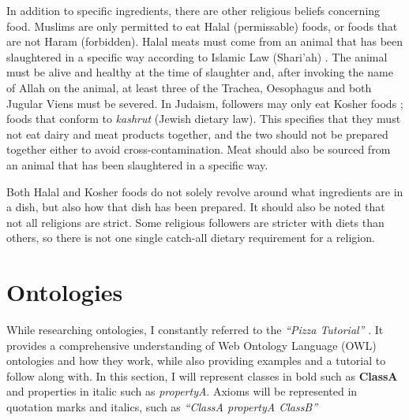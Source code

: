 In addition to specific ingredients, there are other religious beliefs concerning food. Muslims are only permitted to eat Halal (permissable) foods, or foods that are not Haram (forbidden). Halal meats must come from an animal that has been slaughtered in a specific way according to Islamic Law (Shari'ah) \cite{halal_monitoring_committee_2018}. The animal must be alive and healthy at the time of slaughter and, after invoking the name of Allah on the animal, at least three of the Trachea, Oesophagus and both Jugular Viens must be severed. In Judaism, followers may only eat Kosher foods \cite{kosher_2023} ; foods that conform to \textit{kashrut} (Jewish dietary law). This specifies that they must not eat dairy and meat products together, and the two should not be prepared together either to avoid cross-contamination. Meat should also be sourced from an animal that has been slaughtered in a specific way.

Both Halal and Kosher foods do not solely revolve around what ingredients are in a dish, but also how that dish has been prepared. It should also be noted that not all religions are strict. Some religious followers are stricter with diets than others, so there is not one single catch-all dietary requirement for a religion.


\section{Ontologies}

While researching ontologies, I constantly referred to the \textit{``Pizza Tutorial''} \cite{pizza_tutorial_site}. It provides a comprehensive understanding of Web Ontology Language (OWL) ontologies and how they work, while also providing examples and a tutorial to follow along with. In this section, I will represent classes in bold such as \textbf{ClassA} and properties in italic such as \textit{propertyA}. Axioms will be represented in quotation marks and italics, such as \textit{``ClassA propertyA ClassB''}

